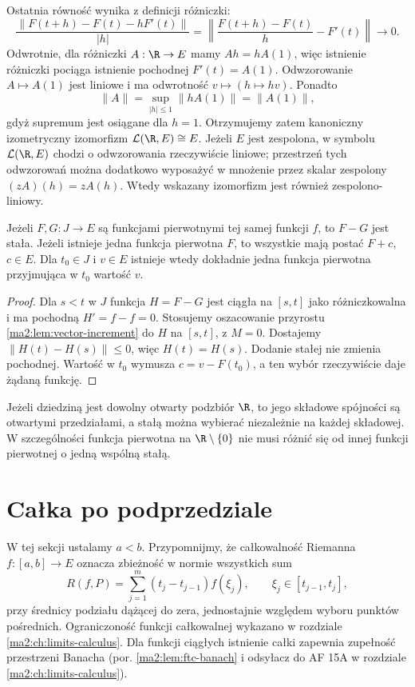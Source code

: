 Ostatnia równość wynika z definicji różniczki:
\[
 \frac{\|F(t+h)-F(t)-hF'(t)\|}{|h|}
 =\left\|\frac{F(t+h)-F(t)}h-F'(t)\right\|
 \longrightarrow0.
\]
Odwrotnie, dla różniczki $A:\R\to E$ mamy
$Ah=hA(1)$, więc istnienie różniczki pociąga
istnienie pochodnej $F'(t)=A(1)$.
Odwzorowanie $A\mapsto A(1)$ jest liniowe
i ma odwrotność $v\mapsto(h\mapsto hv)$.
Ponadto
\[
 \|A\|=\sup_{|h|\le1}\|hA(1)\|=\|A(1)\|,
\]
gdyż supremum jest osiągane dla $h=1$.
Otrzymujemy zatem kanoniczny izometryczny
izomorfizm $\mathcal L(\R,E)\cong E$.
Jeżeli $E$ jest zespolona, w symbolu
$\mathcal L(\R,E)$ chodzi o odwzorowania
rzeczywiście liniowe; przestrzeń tych
odwzorowań można dodatkowo wyposażyć
w mnożenie przez skalar zespolony
$(zA)(h)=zA(h)$. Wtedy wskazany izomorfizm
jest również zespolono-liniowy.

\begin{stwierdzenie}
\label{ma2:prop:primitive-uniqueness}
Jeżeli $F,G:J\to E$ są funkcjami pierwotnymi
tej samej funkcji $f$, to $F-G$ jest stała.
Jeżeli istnieje jedna funkcja pierwotna $F$,
to wszystkie mają postać $F+c$, $c\in E$.
Dla $t_0\in J$ i $v\in E$ istnieje wtedy
dokładnie jedna funkcja pierwotna przyjmująca
w $t_0$ wartość $v$.
\end{stwierdzenie}
\begin{proof}
Dla $s<t$ w $J$ funkcja $H=F-G$ jest
ciągła na $[s,t]$ jako różniczkowalna
i ma pochodną $H'=f-f=0$.
Stosujemy oszacowanie przyrostu
\ref{ma2:lem:vector-increment} do $H$
na $[s,t]$, z $M=0$. Dostajemy
$\|H(t)-H(s)\|\le0$, więc $H(t)=H(s)$.
Dodanie stałej nie zmienia pochodnej.
Wartość w $t_0$ wymusza
$c=v-F(t_0)$, a ten wybór rzeczywiście daje
żądaną funkcję.
\end{proof}

Jeżeli dziedziną jest dowolny otwarty podzbiór
$\R$, to jego składowe spójności są otwartymi
przedziałami, a stałą można wybierać niezależnie
na każdej składowej.
W szczególności funkcja pierwotna na
$\R\setminus\{0\}$ nie musi różnić się od innej
funkcji pierwotnej o jedną wspólną stałą.

\section{Całka po podprzedziale}

W tej sekcji ustalamy $a<b$.
Przypomnijmy, że całkowalność Riemanna
$f:[a,b]\to E$ oznacza zbieżność w normie
wszystkich sum
\[
 R(f,P)=\sum_{j=1}^m(t_j-t_{j-1})f(\xi_j),
 \qquad \xi_j\in[t_{j-1},t_j],
\]
przy średnicy podziału dążącej do zera, jednostajnie
względem wyboru punktów pośrednich.
Ograniczoność funkcji całkowalnej wykazano
w rozdziale \ref{ma2:ch:limits-calculus}.
Dla funkcji ciągłych istnienie całki zapewnia
zupełność przestrzeni Banacha (por.
\ref{ma2:lem:ftc-banach} i odsyłacz do AF 15A
w rozdziale \ref{ma2:ch:limits-calculus}).

